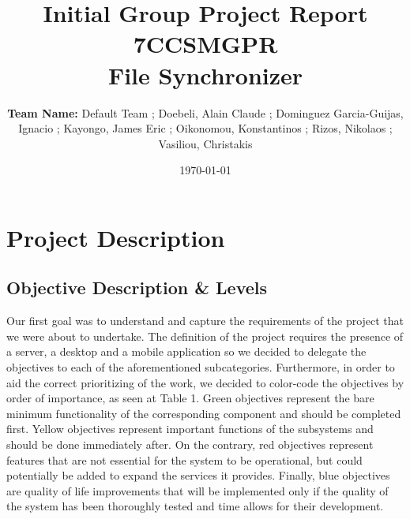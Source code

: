 \documentclass[11pt]{article}
\title{ Initial Group Project Report\\
7CCSMGPR\\[2\baselineskip]
File Synchronizer}
\author{\textbf{Team Name:} Default Team ; Doebeli, Alain Claude ; Dominguez Garcia-Guijas, Ignacio ; Kayongo, James Eric ; 
Oikonomou, Konstantinos ; Rizos, Nikolaos ; Vasiliou, Christakis}
\date{\today}
\begin{document}
\null  %
\nointerlineskip  %
\vfill
\let\snewpage \newpage
\let\newpage \relax
\maketitle
\let \newpage \snewpage
\vfill 
\break %

\section{Project Description}
	\subsection{Objective Description \& Levels}
	Our first goal was to understand and capture the requirements of the project that we were about to undertake. The definition of the project requires the presence of a server, a desktop and a mobile application so we decided to delegate the objectives to each of the aforementioned subcategories. Furthermore, in order to aid the correct prioritizing of the work, we decided to color-code the objectives by order of importance, as seen at Table 1. Green objectives represent the bare minimum functionality of the corresponding component and should be completed first. Yellow objectives represent important functions of the subsystems and should be done immediately after. On the contrary, red objectives represent features that are not essential for the system to be operational, but could potentially be added to expand the services it provides. Finally, blue objectives are quality of life improvements that will be implemented only if the quality of the system has been thoroughly tested and time allows for their development.\\
\end{document}
